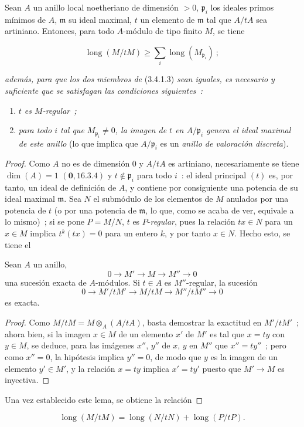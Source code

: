\begin{lemma}[3.4.1.2]
\label{IV.2.3.4.1.2-fr}
Sean $A$ un anillo local noetheriano de dimensión $>0$, $\mathfrak p_i$ los
ideales primos mínimos de $A$, $\mathfrak m$ su ideal maximal, $t$ un
elemento de $\mathfrak m$ tal que $A/tA$ sea artiniano. Entonces, para todo
$A$-módulo de tipo finito $M$, se tiene
\end{lemma}

\begin{env}[3.4.1.3]
\label{IV.2.3.4.1.3-fr}
\[
\operatorname{long}(M/tM)
\geqslant\sum_i\operatorname{long}(M_{\mathfrak p_i})~;
\]
\end{env}

\textit{además, para que los dos miembros de} (3.4.1.3) \textit{sean iguales, es necesario y
suficiente que se satisfagan las condiciones siguientes~:}


\begin{enumerate}
\item[$\alpha$)] \textit{$t$ es $M$-regular~;}
\item[$\beta$)] \textit{para todo $i$ tal que $M_{\mathfrak p_i}\neq0$, la imagen de $t$
en $A/\mathfrak p_i$ genera el ideal maximal de este anillo} (lo que implica
que $A/\mathfrak p_i$ es un \emph{anillo de valoración discreta}).
\end{enumerate}

\begin{proof}
Como $A$ no es de dimensión $0$ y $A/tA$ es artiniano, necesariamente se tiene
$\dim(A)=1$ $(\mathbf{0},16.3.4)$ y $t\notin\mathfrak p_i$ para todo
$i$~: el ideal principal $(t)$ es, por tanto, un ideal de definición de $A$, y
contiene por consiguiente una potencia de su ideal maximal $\mathfrak m$. Sea $N$
el submódulo de los elementos de $M$ anulados por una potencia de $t$ (o por
una potencia de $\mathfrak m$, lo que, como se acaba de ver, equivale a lo mismo)~;
si se pone $P=M/N$, $t$ es $P$-\emph{regular}, pues la relación $tx\in N$
para un $x\in M$ implica $t^k(tx)=0$ para un entero $k$, y por tanto $x\in N$.
Hecho esto, se tiene el

\begin{lemma}[3.4.1.4]
\label{IV.2.3.4.1.4-fr}
Sean $A$ un anillo,
\[
0\longrightarrow M'\longrightarrow M\longrightarrow M''\longrightarrow0
\]
una sucesión exacta de $A$-módulos. Si $t\in A$ es $M''$-regular, la sucesión
\[
0\longrightarrow M'/tM'\longrightarrow M/tM
\longrightarrow M''/tM''\longrightarrow0
\]
es exacta.
\end{lemma}

\begin{proof}
Como $M/tM=M\otimes_A(A/tA)$, basta demostrar la exactitud en $M'/tM'$~;
ahora bien, si la imagen $x\in M$ de un elemento $x'$ de $M'$ es tal que
$x=ty$ con $y\in M$, se deduce, para las imágenes $x''$, $y''$ de $x$, $y$ en
$M''$ que $x''=ty''$~; pero como $x''=0$, la hipótesis implica $y''=0$, de
modo que $y$ es la imagen de un elemento $y'\in M'$, y la relación $x=ty$
implica $x'=ty'$ puesto que $M'\to M$ es inyectiva.
\end{proof}

Una vez establecido este lema, se obtiene la relación
\end{proof}

\begin{env}[3.4.1.5]
\label{IV.2.3.4.1.5-fr}
\[
\operatorname{long}(M/tM)
=\operatorname{long}(N/tN)+\operatorname{long}(P/tP).
\]
\end{env}

